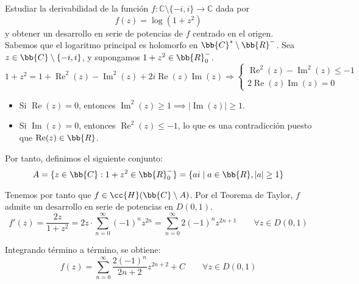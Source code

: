 \documentclass[12pt]{article}
\renewcommand{\Re}{\operatorname{Re}} %
\renewcommand{\Im}{\operatorname{Im}}
\begin{document}
    \begin{ejercicio}[3.5 puntos]
        Estudiar la derivabilidad de la función $f : \mathbb{C} \setminus \{-i, i\} \to \mathbb{C}$ dada por
        \[
            f(z) = \log(1 + z^2)
        \]
        y obtener un desarrollo en serie de potencias de $f$ centrado en el origen.\\

        Sabemos que el logaritmo principal es holomorfo en $\bb{C}^*\setminus \bb{R}^-$. Sea $z\in \bb{C}\setminus \{-i,i\}$, y supongamos $1+z^2\in \bb{R}_0^-$.
        \begin{equation*}
            1+ z^2 = 1+\Re^2(z) - \Im^2(z) + 2i\Re(z)\Im(z)\Longrightarrow
            \left\{
            \begin{array}{l}
                \Re^2(z) - \Im^2(z) \leq -1 \\
                2\Re(z)\Im(z) = 0
            \end{array}
            \right.
        \end{equation*}
        \begin{itemize}
            \item Si $\Re(z)=0$, entonces $\Im^2(z) \geq 1\implies |\Im(z)|\geq 1$.
            \item Si $\Im(z)=0$, entonces $\Re^2(z) \leq -1$, lo que es una contradicción puesto que $\Re(z)\in \bb{R}$.
        \end{itemize}

        Por tanto, definimos el siguiente conjunto:
        \begin{equation*}
            A=\{z\in \bb{C} : 1+z^2\in \bb{R}_0^-\} = \{ai\mid a\in \bb{R}, |a|\geq 1\}
        \end{equation*}

        Tenemos por tanto que $f\in \cc{H}(\bb{C}\setminus A)$. Por el Teorema de Taylor, $f$ admite un desarrollo en serie de potencias en $D(0,1)$.
        \begin{equation*}
            f'(z) = \frac{2z}{1+z^2}
            = 2z\cdot \sum_{n=0}^{\infty} (-1)^n z^{2n}
            = \sum_{n=0}^{\infty} 2(-1)^n z^{2n+1}\qquad \forall z\in D(0,1)
        \end{equation*}

        Integrando término a término, se obtiene:
        \begin{equation*}
            f(z) = \sum_{n=0}^{\infty} \frac{2(-1)^n}{2n+2} z^{2n+2} + C \qquad \forall z\in D(0,1)
        \end{equation*}


\end{ejercicio}
\end{document}
